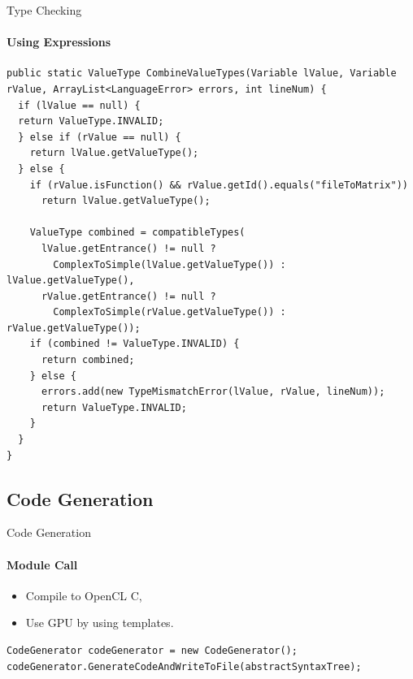 \begin{frame}[fragile,t]{Type Checking}
\framesubtitle{Using Expressions}

\begin{lstlisting}[caption=The method checking if two types are compatible according to the specification of GAMBL ,frame=tlrb, basicstyle=\tiny, numbers=none]
public static ValueType CombineValueTypes(Variable lValue, Variable rValue, ArrayList<LanguageError> errors, int lineNum) {
  if (lValue == null) {
  return ValueType.INVALID;
  } else if (rValue == null) {
    return lValue.getValueType();
  } else {
    if (rValue.isFunction() && rValue.getId().equals("fileToMatrix"))
      return lValue.getValueType();
    
    ValueType combined = compatibleTypes(
      lValue.getEntrance() != null ? 
        ComplexToSimple(lValue.getValueType()) : lValue.getValueType(),
      rValue.getEntrance() != null ? 
        ComplexToSimple(rValue.getValueType()) : rValue.getValueType());
    if (combined != ValueType.INVALID) {
      return combined;
    } else {
      errors.add(new TypeMismatchError(lValue, rValue, lineNum));
      return ValueType.INVALID;
    }
  }
}
\end{lstlisting}

\end{frame}

\subsection{Code Generation}
\begin{frame}[fragile,t]{Code Generation}
\framesubtitle{Module Call}
\begin{itemize}
  \item Compile to OpenCL C,
  \item Use GPU by using templates.
\end{itemize}

\begin{lstlisting}[caption=The creation of an instance of the Code Generation module and the call invoking it ,frame=tlrb, basicstyle=\tiny, numbers=none]
CodeGenerator codeGenerator = new CodeGenerator();
codeGenerator.GenerateCodeAndWriteToFile(abstractSyntaxTree);
\end{lstlisting}

\end{frame}

